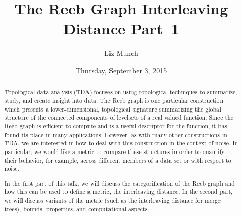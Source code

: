\documentclass{UAmathtalk}
\author{Liz Munch}
\title{The Reeb Graph Interleaving Distance Part~1}
\date{Thursday, September 3, 2015}
\begin{document}
\maketitle

\begin{abstract}
Topological data analysis (TDA) focuses on using topological techniques to summarize, study, and create insight into data. The Reeb graph is one particular construction which presents a lower-dimensional, topological signature summarizing the global structure of the connected components of levelsets of a real valued function. Since the Reeb graph is efficient to compute and is a useful descriptor for the function, it has found its place in many applications.  However, as with many other constructions in TDA, we are interested in how to deal with this construction in the context of noise.  In particular, we would like a metric to compare these structures in order to quantify their behavior, for example, across different members of a data set or with respect to noise.

In the first part of this talk, we will discuss the categorification of the Reeb graph and how this can be used to define a metric, the interleaving distance.  In the second part, we will discuss variants of the metric (such as the interleaving distance for merge trees), bounds, properties, and computational aspects.
\end{abstract}
\end{document}
